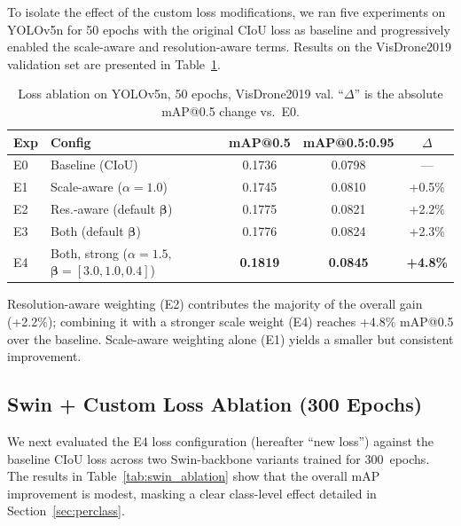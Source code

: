 \documentclass[conference]{IEEEtran}
\begin{document}
To isolate the effect of the custom loss modifications, we ran five
experiments on YOLOv5n for 50 epochs with the original CIoU loss as baseline
and progressively enabled the scale-aware and resolution-aware terms.
Results on the VisDrone2019 validation set are presented in
Table~\ref{tab:loss_ablation}.

\begin{table}[t]
\centering
\caption{Loss ablation on YOLOv5n, 50 epochs, VisDrone2019 val.
  ``$\Delta$'' is the absolute mAP@0.5 change vs.\ E0.}
\begin{tabular}{llccc}
\toprule
\textbf{Exp} & \textbf{Config}
  & \textbf{mAP@0.5} & \textbf{mAP@0.5:0.95} & \textbf{$\Delta$} \\
\midrule
E0 & Baseline (CIoU)                          & 0.1736 & 0.0798 & ---     \\
E1 & Scale-aware ($\alpha{=}1.0$)             & 0.1745 & 0.0810 & +0.5\%  \\
E2 & Res.-aware (default $\boldsymbol{\beta}$)& 0.1775 & 0.0821 & +2.2\%  \\
E3 & Both (default $\boldsymbol{\beta}$)      & 0.1776 & 0.0824 & +2.3\%  \\
E4 & Both, strong ($\alpha{=}1.5$,
     $\boldsymbol{\beta}{=}[3.0,1.0,0.4]$)   & \textbf{0.1819} & \textbf{0.0845} & \textbf{+4.8\%} \\
\bottomrule
\end{tabular}
\label{tab:loss_ablation}
\end{table}

Resolution-aware weighting (E2) contributes the majority of the overall gain
(+2.2\%); combining it with a stronger scale weight (E4) reaches +4.8\%
mAP@0.5 over the baseline.  Scale-aware weighting alone (E1) yields a
smaller but consistent improvement.

\subsection{Swin + Custom Loss Ablation (300 Epochs)}

We next evaluated the E4 loss configuration (hereafter ``new loss'') against
the baseline CIoU loss across two Swin-backbone variants trained for
300~epochs.  The results in Table~\ref{tab:swin_ablation} show that the
overall mAP improvement is modest, masking a clear class-level effect
detailed in Section~\ref{sec:perclass}.
\end{document}
